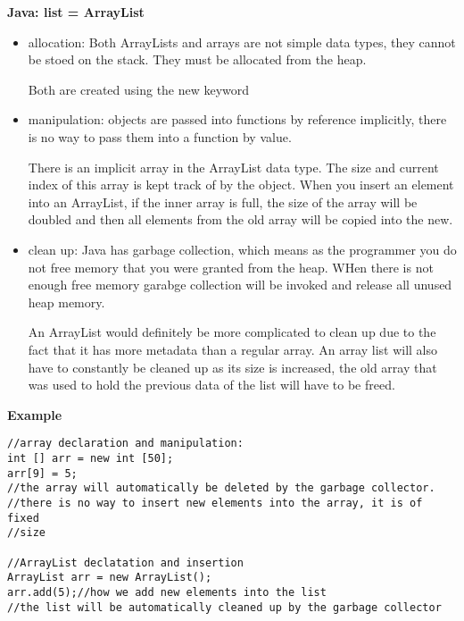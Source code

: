 \documentclass[11pt]{article}
\begin{document}
\pagebreak
\textbf{Java: list = ArrayList}
\begin{itemize}
    \item allocation:
        Both ArrayLists and arrays are not simple data types, they cannot be
        stoed on the stack.  They must be allocated from the heap.

        Both are created using the new keyword

    \item manipulation:
        objects are passed into functions by reference implicitly, there is no
        way to pass them into a function by value.

        There is an implicit array in the ArrayList data type.  The size and
        current index of this array is kept track of by the object.  When you
        insert an element into an ArrayList, if the inner array is full, the
        size of the array will be doubled and then all elements from the old
        array will be copied into the new.

    \item clean up:
        Java has garbage collection, which means as the programmer you do not
        free memory that you were granted from the heap.  WHen there is not
        enough free memory garabge collection will be invoked and release all
        unused heap memory.

        An ArrayList would definitely be more complicated to clean up due to
        the fact that it has more metadata than a regular array.  An array list
        will also have to constantly be cleaned up as its size is increased,
        the old array that was used to hold the previous data of the list will
        have to be freed.
\end{itemize}


\textbf{Example}


\begin{lstlisting}[style=MyJava]
//array declaration and manipulation:
int [] arr = new int [50];
arr[9] = 5;
//the array will automatically be deleted by the garbage collector.
//there is no way to insert new elements into the array, it is of fixed
//size

//ArrayList declatation and insertion
ArrayList arr = new ArrayList();
arr.add(5);//how we add new elements into the list
//the list will be automatically cleaned up by the garbage collector
\end{lstlisting}
\end{document}
